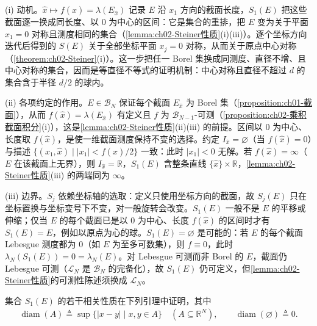 \documentclass[../../main.tex]{subfiles}%
\begin{document}
\begin{remark}\label{remark:ch02-Steiner对称化动机}
(i) 动机。$\hat x\mapsto f(\hat x)=\lambda(E_{\hat x})$ 记录 $E$ 沿 $x_1$ 方向的截面长度，$S_1(E)$ 把这些截面逐一换成同长度、以 $0$ 为中心的区间：它是集合的重排，把 $E$ 变为关于平面 $x_1=0$ 对称且测度相同的集合（\cref{lemma:ch02-Steiner性质}(i)(iii)）。逐个坐标方向迭代后得到的 $S(E)$ 关于全部坐标平面 $x_j=0$ 对称，从而关于原点中心对称（\cref{theorem:ch02-Steiner}(i)）。这一步把任一 Borel 集换成同测度、直径不增、且中心对称的集合，因而是等直径不等式的证明机制：中心对称且直径不超过 $d$ 的集合含于半径 $d/2$ 的球内。

(ii) 各项约定的作用。$E\in\mathscr B_N$ 保证每个截面 $E_{\hat x}$ 为 Borel 集（\cref{proposition:ch01-截面}），从而 $f(\hat x)=\lambda(E_{\hat x})$ 有定义且 $f$ 为 $\mathscr B_{N-1}$-可测（\cref{proposition:ch02-乘积截面积分}(i)），这是\cref{lemma:ch02-Steiner性质}(ii)(iii) 的前提。区间以 $0$ 为中心、长度取 $f(\hat x)$，是使一维截面测度保持不变的选择。约定 $I_{\hat x}=\varnothing$（当 $f(\hat x)=0$）与描述 $\{(x_1,\hat x)\mid|x_1|<f(\hat x)/2\}$ 一致：此时 $|x_1|<0$ 无解。若 $f(\hat x)=\infty$（$E$ 在该截面上无界），则 $I_{\hat x}=\mathbb R$，$S_1(E)$ 含整条直线 $\{\hat x\}\times\mathbb R$，\cref{lemma:ch02-Steiner性质}(iii) 的两端同为 $\infty$。

(iii) 边界。$S_j$ 依赖坐标轴的选取：定义只使用坐标方向的截面，故 $S_j(E)$ 只在坐标置换与坐标变号下不变，对一般旋转会改变。$S_1(E)$ 一般不是 $E$ 的平移或伸缩；仅当 $E$ 的每个截面已是以 $0$ 为中心、长度 $f(\hat x)$ 的区间时才有 $S_1(E)=E$，例如以原点为心的球。$S_1(E)=\varnothing$ 是可能的：若 $E$ 的每个截面 Lebesgue 测度都为 $0$（如 $E$ 为至多可数集），则 $f\equiv0$，此时 $\lambda_N(S_1(E))=0=\lambda_N(E)$。对 Lebesgue 可测而非 Borel 的 $E$，截面仍 Lebesgue 可测（$\mathscr L_N$ 是 $\mathscr B_N$ 的完备化），故 $S_1(E)$ 仍可定义，但\cref{lemma:ch02-Steiner性质}的可测性陈述须换成 $\mathscr L_N$。
\end{remark}

集合 $S_1(E)$ 的若干相关性质在下列引理中证明，其中
\begin{align*}
\operatorname{diam}(A)\triangleq\sup\{|x-y|\mid x,y\in A\}\quad(A\subseteq\mathbb R^N),\qquad\operatorname{diam}(\varnothing)\triangleq0.
\end{align*}
\end{document}
